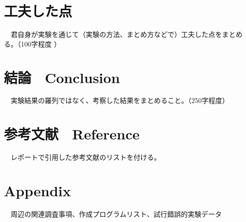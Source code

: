 \section{工夫した点}
　君自身が実験を通じて（実験の方法、まとめ方などで）工夫した点をまとめる。（100字程度 ）

\section{結論　Conclusion}
　実験結果の羅列ではなく、考察した結果をまとめること。（250字程度）

\section{参考文献　Reference}
　レポートで引用した参考文献のリストを付ける。

\appendix
\section{Appendix}
　周辺の関連調査事項、作成プログラムリスト、試行錯誤的実験データ


